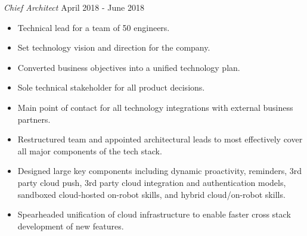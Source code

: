 \documentclass[a4paper]{article}
\begin{document}
\begin{addmargin}[1em]{0em}
    \textit{Chief Architect} \hfill April 2018 - June 2018\\
    \vspace{-1mm}
    \begin{itemize} \itemsep 1pt
        \item Technical lead for a team of 50 engineers.
        \item Set technology vision and direction for the company.
        \item Converted business objectives into a unified technology plan.
        \item Sole technical stakeholder for all product decisions.
        \item Main point of contact for all technology integrations with external
            business partners.
        \item Restructured team and appointed architectural leads to most effectively
            cover all major components of the tech stack.
        \item Designed large key components including dynamic proactivity, reminders, 3rd party
            cloud push, 3rd party cloud integration and authentication models, 
            sandboxed cloud-hosted on-robot skills, and hybrid cloud/on-robot skills.
        \item Spearheaded unification of cloud infrastructure to enable faster cross stack
            development of new features.
        

\end{itemize}
\end{addmargin}
\end{document}
